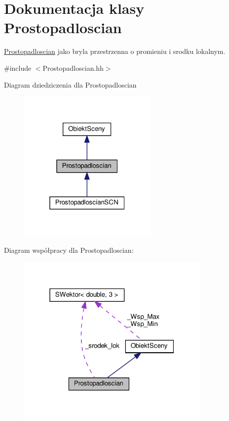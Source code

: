 \hypertarget{classProstopadloscian}{}\section{Dokumentacja klasy Prostopadloscian}
\label{classProstopadloscian}


\hyperlink{classProstopadloscian}{Prostopadloscian} jako bryla przestrzenna o promieniu i srodku lokalnym.  




{\ttfamily \#include $<$Prostopadloscian.\+hh$>$}



Diagram dziedziczenia dla Prostopadloscian
\nopagebreak
\begin{figure}[H]
\begin{center}
\leavevmode
\includegraphics[width=193pt]{classProstopadloscian__inherit__graph}
\end{center}
\end{figure}


Diagram współpracy dla Prostopadloscian\+:
\nopagebreak
\begin{figure}[H]
\begin{center}
\leavevmode
\includegraphics[width=268pt]{classProstopadloscian__coll__graph}
\end{center}
\end{figure}
